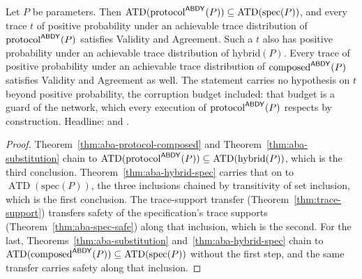 \begin{theorem}
  \label{thm:aba-protocol}
  \leanok
  Let $P$ be parameters.
  Then $\operatorname{ATD}(\mathrm{protocol}^{\mathsf{ABDY}}(P)) \subseteq \operatorname{ATD}(\mathrm{spec}(P))$, and every trace $t$ of positive probability under an achievable trace distribution of $\mathrm{protocol}^{\mathsf{ABDY}}(P)$ satisfies Validity and Agreement.
  Such a $t$ also has positive probability under an achievable trace distribution of $\mathrm{hybrid}(P)$. Every trace of positive probability under an achievable trace distribution of $\mathrm{composed}^{\mathsf{ABDY}}(P)$ satisfies Validity and Agreement as well.
  The statement carries no hypothesis on $t$ beyond positive probability, the corruption budget included: that budget is a guard of the network, which every execution of $\mathrm{protocol}^{\mathsf{ABDY}}(P)$ respects by construction.
  Headline:  and .
\end{theorem}

\begin{proof}\leanok
  Theorem~\ref{thm:aba-protocol-composed} and Theorem~\ref{thm:aba-substitution} chain to $\operatorname{ATD}(\mathrm{protocol}^{\mathsf{ABDY}}(P)) \subseteq \operatorname{ATD}(\mathrm{hybrid}(P))$, which is the third conclusion.
  Theorem~\ref{thm:aba-hybrid-spec} carries that on to $\operatorname{ATD}(\mathrm{spec}(P))$, the three inclusions chained by transitivity of set inclusion, which is the first conclusion.
  The trace-support transfer (Theorem~\ref{thm:trace-support}) transfers safety of the specification's trace supports (Theorem~\ref{thm:aba-spec-safe}) along that inclusion, which is the second.
  For the last, Theorems~\ref{thm:aba-substitution} and~\ref{thm:aba-hybrid-spec} chain to $\operatorname{ATD}(\mathrm{composed}^{\mathsf{ABDY}}(P)) \subseteq \operatorname{ATD}(\mathrm{spec}(P))$ without the first step, and the same transfer carries safety along that inclusion.
\end{proof}
